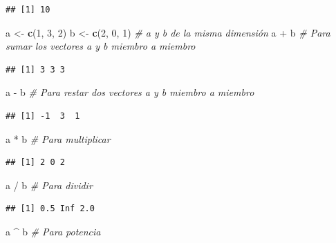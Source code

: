 \documentclass[10pt,]{krantz}
\makeatletter
\newenvironment{Shaded}{\begin{snugshade}}{\end{snugshade}}
\newcommand{\KeywordTok}[1]{\textcolor[rgb]{0.13,0.29,0.53}{\textbf{{#1}}}}
\newcommand{\DecValTok}[1]{\textcolor[rgb]{0.00,0.00,0.81}{{#1}}}
\newcommand{\StringTok}[1]{\textcolor[rgb]{0.31,0.60,0.02}{{#1}}}
\newcommand{\CommentTok}[1]{\textcolor[rgb]{0.56,0.35,0.01}{\textit{{#1}}}}
\newcommand{\NormalTok}[1]{{#1}}
\newenvironment{kframe}{%
\medskip{}
\setlength{\fboxsep}{.8em}
 \def\at@end@of@kframe{}%
 \ifinner\ifhmode%
  \def\at@end@of@kframe{\end{minipage}}%
  \begin{minipage}{\columnwidth}%
 \fi\fi%
 \def\FrameCommand##1{\hskip\@totalleftmargin \hskip-\fboxsep
 \colorbox{shadecolor}{##1}\hskip-\fboxsep
     \hskip-\linewidth \hskip-\@totalleftmargin \hskip\columnwidth}%
 \MakeFramed {\advance\hsize-\width
   \@totalleftmargin\z@ \linewidth\hsize
   \@setminipage}}%
 {\par\unskip\endMakeFramed%
 \at@end@of@kframe}
\renewenvironment{Shaded}{\begin{kframe}}{\end{kframe}}
\makeatother
\begin{document}
\begin{verbatim}
## [1] 10
\end{verbatim}

\begin{Shaded}
\begin{Highlighting}[]
\NormalTok{a <-}\StringTok{ }\KeywordTok{c}\NormalTok{(}\DecValTok{1}\NormalTok{, }\DecValTok{3}\NormalTok{, }\DecValTok{2}\NormalTok{)}
\NormalTok{b <-}\StringTok{ }\KeywordTok{c}\NormalTok{(}\DecValTok{2}\NormalTok{, }\DecValTok{0}\NormalTok{, }\DecValTok{1}\NormalTok{)  }\CommentTok{# a y b de la misma dimensión}
\NormalTok{a +}\StringTok{ }\NormalTok{b  }\CommentTok{# Para sumar los vectores a y b miembro a miembro}
\end{Highlighting}
\end{Shaded}

\begin{verbatim}
## [1] 3 3 3
\end{verbatim}

\begin{Shaded}
\begin{Highlighting}[]
\NormalTok{a -}\StringTok{ }\NormalTok{b  }\CommentTok{# Para restar dos vectores a y b miembro a miembro}
\end{Highlighting}
\end{Shaded}

\begin{verbatim}
## [1] -1  3  1
\end{verbatim}

\begin{Shaded}
\begin{Highlighting}[]
\NormalTok{a *}\StringTok{ }\NormalTok{b  }\CommentTok{# Para multiplicar}
\end{Highlighting}
\end{Shaded}

\begin{verbatim}
## [1] 2 0 2
\end{verbatim}

\begin{Shaded}
\begin{Highlighting}[]
\NormalTok{a /}\StringTok{ }\NormalTok{b  }\CommentTok{# Para dividir}
\end{Highlighting}
\end{Shaded}

\begin{verbatim}
## [1] 0.5 Inf 2.0
\end{verbatim}

\begin{Shaded}
\begin{Highlighting}[]
\NormalTok{a ^}\StringTok{ }\NormalTok{b  }\CommentTok{# Para potencia}
\end{Highlighting}
\end{Shaded}
\end{document}
